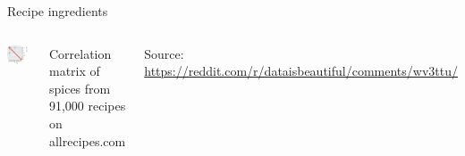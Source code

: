 \documentclass[aspectratio=169,usenames,dvipsnames]{beamer}
\begin{document}
%
\begin{frame}{Recipe ingredients}\centering
    \begin{columns}[T]
            \includegraphics[width=0.9\textwidth]{fig/recipes}

            Correlation matrix of spices from 91,000 recipes on allrecipes.com

            \vspace{1em}
            {\footnotesize
            Source: \url{https://reddit.com/r/dataisbeautiful/comments/wv3ttu/}

            }

    \end{columns}
\end{frame}
\end{document}

